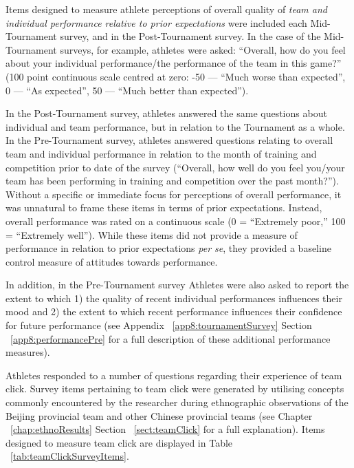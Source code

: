 \begin{CJK}{UTF8}{gbsn}
Items designed to measure athlete perceptions of overall quality of \textit{team and individual performance relative to prior expectations} were included each Mid-Tournament survey, and in the Post-Tournament survey.  In the case of the Mid-Tournament surveys, for example, athletes were asked: ``Overall, how do you feel about your individual performance/the performance of the team in this game?'' (100 point continuous scale centred at zero: -50 --- ``Much worse than expected'', 0 --- ``As expected'', 50 ---  ``Much better than expected'').

In the Post-Tournament survey, athletes answered the same questions about individual and team performance, but in relation to the Tournament as a whole.  In the Pre-Tournament survey, athletes answered questions relating to overall team and individual performance in relation to the month of training and competition prior to date of the survey (``Overall, how well do you feel you/your team has been performing in training and competition over the past month?'').
Without a specific or immediate focus for perceptions of overall performance, it was unnatural to frame these items in terms of prior expectations.  Instead, overall performance was rated on a continuous scale (0 = ``Extremely poor,'' 100 = ``Extremely well'').  While these items did not provide a measure of performance in relation to prior expectations \textit{per se}, they provided a baseline control measure of attitudes towards performance.

In addition, in the Pre-Tournament survey Athletes were also asked to report the extent to which 1) the quality of recent individual performances influences their mood and 2) the extent to which recent performance influences their confidence for future performance (see Appendix ~\ref{app8:tournamentSurvey} Section ~\ref{app8:performancePre} for a full description of these additional performance measures).

Athletes responded to a number of questions regarding their experience of team click.  Survey items pertaining to team click were generated by utilising concepts commonly encountered by the researcher during ethnographic observations of the Beijing provincial team and other Chinese provincial teams (see Chapter ~\ref{chap:ethnoResults} Section ~\ref{sect:teamClick} for a full explanation).  Items designed to measure team click are displayed in Table ~\ref{tab:teamClickSurveyItems}.




\end{CJK}
